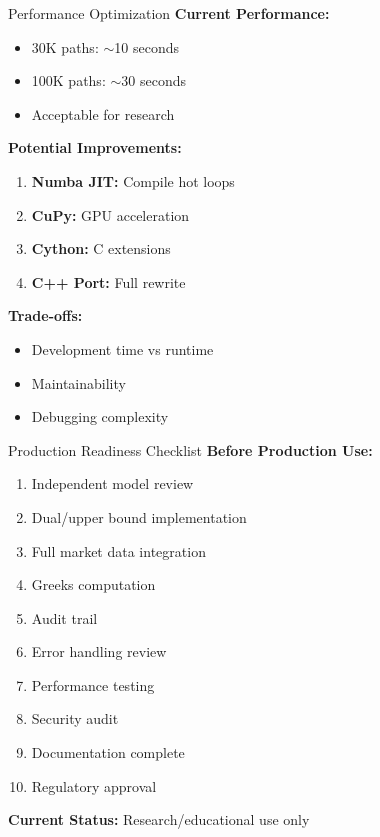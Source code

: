 \documentclass[aspectratio=169,11pt]{beamer}
\begin{document}
\begin{frame}{Performance Optimization}
\textbf{Current Performance:}
\begin{itemize}
    \item 30K paths: $\sim$10 seconds
    \item 100K paths: $\sim$30 seconds
    \item Acceptable for research
\end{itemize}

\textbf{Potential Improvements:}
\begin{enumerate}
    \item \textbf{Numba JIT:} Compile hot loops
    \item \textbf{CuPy:} GPU acceleration
    \item \textbf{Cython:} C extensions
    \item \textbf{C++ Port:} Full rewrite
\end{enumerate}

\textbf{Trade-offs:}
\begin{itemize}
    \item Development time vs runtime
    \item Maintainability
    \item Debugging complexity
\end{itemize}
\end{frame}

\begin{frame}{Production Readiness Checklist}
\textbf{Before Production Use:}
\begin{enumerate}
    \item[$\square$] Independent model review
    \item[$\square$] Dual/upper bound implementation
    \item[$\square$] Full market data integration
    \item[$\square$] Greeks computation
    \item[$\square$] Audit trail
    \item[$\square$] Error handling review
    \item[$\square$] Performance testing
    \item[$\square$] Security audit
    \item[$\square$] Documentation complete
    \item[$\square$] Regulatory approval
\end{enumerate}

\textbf{Current Status:} Research/educational use only
\end{frame}
\end{document}
